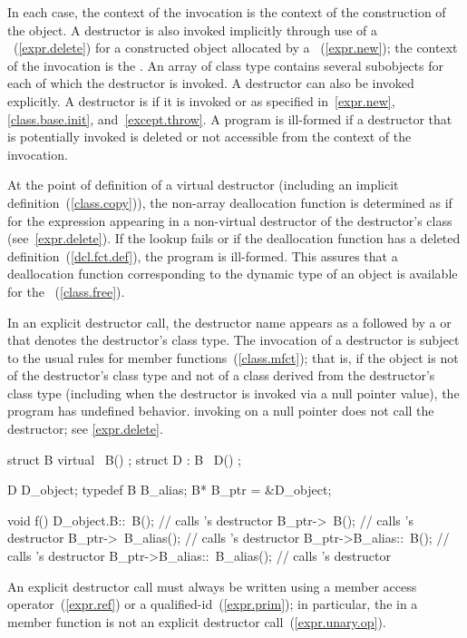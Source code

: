 %
%
In each case, the context of the invocation is the context of the construction of
the object. A destructor is also invoked implicitly through use of a
~(\ref{expr.delete}) for a constructed object allocated
by a ~(\ref{expr.new}); the context of the invocation is the
.
\enternote An array of class type contains several subobjects for each of which
the destructor is invoked. \exitnote
A destructor can also be invoked explicitly. A destructor is 
if it is invoked or as specified in~\ref{expr.new}, \ref{class.base.init},
and~\ref{except.throw}.
A program is ill-formed if a destructor that is potentially invoked is deleted
or not accessible from the context of the invocation.

\pnum
At the point of definition of a virtual destructor (including an implicit
definition~(\ref{class.copy})), the non-array deallocation function is 
determined as if for the expression  appearing in a
non-virtual destructor of the destructor's class (see~\ref{expr.delete}).
If the lookup fails or if the deallocation function has
a deleted definition~(\ref{dcl.fct.def}), the program is ill-formed.
\enternote
This assures that a deallocation function corresponding to the dynamic type of an
object is available for the
~(\ref{class.free}).
\exitnote

\pnum
{}%
In an explicit destructor call, the destructor name appears as a
\tcode{\~{}}
followed by a
 or 
that denotes the destructor's class type.
The invocation of a destructor is subject to the usual rules for member
functions~(\ref{class.mfct});
that is, if the object is not of the destructor's class type and
not of a class derived from the destructor's class type (including when
the destructor is invoked via a null pointer value), the program has
undefined behavior.
\enternote invoking  on a null pointer does not call the
destructor; see \ref{expr.delete}. \exitnote
\enterexample

\begin{codeblock}
struct B {
  virtual ~B() { }
};
struct D : B {
  ~D() { }
};

D D_object;
typedef B B_alias;
B* B_ptr = &D_object;

void f() {
  D_object.B::~B();             // calls 's destructor
  B_ptr->~B();                  // calls 's destructor
  B_ptr->~B_alias();            // calls 's destructor
  B_ptr->B_alias::~B();         // calls 's destructor
  B_ptr->B_alias::~B_alias();   // calls 's destructor
}
\end{codeblock}
\exitexample
\enternote
An explicit destructor call must always be written using
a member access operator~(\ref{expr.ref}) or a qualified-id~(\ref{expr.prim});
in particular, the
in a member function is not an explicit destructor call~(\ref{expr.unary.op}).
\exitnote

